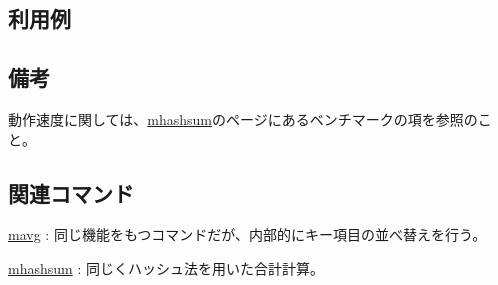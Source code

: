 \subsection*{利用例}

\subsection*{備考}
動作速度に関しては、\hyperref[sect:mhashsum]{mhashsum}のページにあるベンチマークの項を参照のこと。

\subsection*{関連コマンド}
\hyperref[sect:mavg] {mavg} : 同じ機能をもつコマンドだが、内部的にキー項目の並べ替えを行う。

\hyperref[sect:mhashsum]{mhashsum} : 同じくハッシュ法を用いた合計計算。

%
